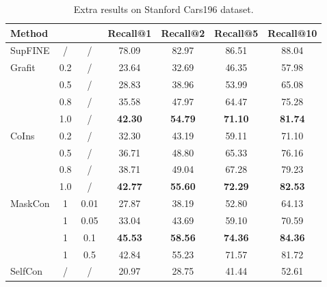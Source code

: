 \documentclass[10pt,twocolumn,letterpaper]{article}
\begin{document}
\begin{table}[htbp]
\centering
\begin{tabular}{@{}l|c|c|cccc@{}}
\toprule
Method                  &  &  & Recall@1       & Recall@2       & Recall@5       & Recall@10      \\ \midrule
SupFINE                 & /   & /      & 78.09          & 82.97          & 86.51          & 88.04          \\ \midrule
\multirow{4}{*}{Grafit} & 0.2 & /      & 23.64          & 32.69          & 46.35          & 57.98          \\
                        & 0.5 & /      & 28.83          & 38.96          & 53.99          & 65.08          \\
                        & 0.8 & /      & 35.58          & 47.97          & 64.47          & 75.28          \\
                        & 1.0 & /      & \textbf{42.30} & \textbf{54.79} & \textbf{71.10} & \textbf{81.74} \\ \midrule
\multirow{4}{*}{CoIns}  & 0.2 & /      & 32.30          & 43.19          & 59.11          & 71.10          \\
                        & 0.5 & /      & 36.71          & 48.80          & 65.33          & 76.16          \\
                        & 0.8 & /      & 38.71          & 49.04          & 67.28          & 79.23          \\
                        & 1.0 & /      & \textbf{42.77} & \textbf{55.60} & \textbf{72.29} & \textbf{82.53} \\ \midrule
MaskCon                 & 1   & 0.01   & 27.87          & 38.19          & 52.80          & 64.13          \\
                        & 1   & 0.05   & 33.04          & 43.69          & 59.10          & 70.59          \\
                        & 1   & 0.1    & \textbf{45.53} & \textbf{58.56} & \textbf{74.36} & \textbf{84.36} \\
                        & 1   & 0.5    & 42.84          & 55.23          & 71.57          & 81.72          \\ \midrule
SelfCon                 & /   & /      & 20.97          & 28.75          & 41.44          & 52.61          \\ \bottomrule
\end{tabular}
\caption{Extra results on Stanford Cars196 dataset.}
\label{tab:cars196}
\end{table}
\end{document}
